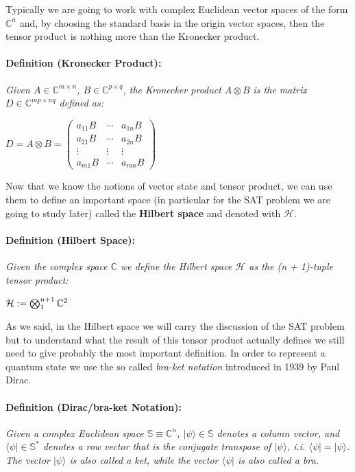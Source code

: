 \documentclass[english]{article}
\newcommand{\sbigotimes}{%
	\mathop{\mathchoice{\textstyle\bigotimes}{\bigotimes}{\bigotimes}{\bigotimes}}%
}
\begin{document}
			Typically we are going to work with complex Euclidean vector spaces of the form $\mathbb{C}^n$ and, by choosing the standard basis in the origin vector spaces, then the tensor product is nothing more than the Kronecker product.
			
			\paragraph{Definition (Kronecker Product):} \emph{Given $A \in \mathbb{C}^{m\times n}$, $B \in \mathbb{C}^{p\times q}$, the Kronecker product $A \otimes B$ is the matrix $D \in \mathbb{C}^{mp\times nq}$ defined as:}
			\begin{center}
				$
				D = A\otimes B =
				\begin{pmatrix}
				a_{11}B & \cdots & a_{1n}B \\
				a_{21}B & \cdots  & a_{2n}B \\
				\vdots & \vdots & \vdots \\
				a_{m1}B & \cdots & a_{mn}B
				\end{pmatrix}
				$
			\end{center}
		
			Now that we know the notions of vector state and tensor product, we can use them to define an important space (in particular for the SAT problem we are going to study later) called the \textbf{Hilbert space} and denoted with $\mathcal{H}$.
			
			\paragraph{Definition (Hilbert Space):} \emph{Given the complex space $\mathbb{C}$ we define the Hilbert space $\mathcal{H}$ as the (n + 1)-tuple tensor product:}
			\begin{center}
				$
				\mathcal{H} := \sbigotimes_1^{n+1} \mathbb{C}^{2}
				$
			\end{center}
		
			As we said, in the Hilbert space we will carry the discussion of the SAT problem but to understand what the result of this tensor product actually defines we still need to give probably the most important definition. In order to represent a quantum state we use the so called \emph{bra-ket notation} introduced in 1939 by Paul Dirac.
			
			\paragraph{Definition (Dirac/bra-ket Notation):} \emph{Given a complex Euclidean space $\mathbb{S} \equiv \mathbb{C}^{n}$, $|\psi\rangle \in \mathbb{S}$ denotes a column vector, and $\langle\psi| \in \mathbb{S}^{*}$ denotes a row vector that is the conjugate transpose of $|\psi\rangle$, i.i. $\langle\psi| = |\psi\rangle$. The vector $|\psi\rangle$ is also called a ket, while the vector $\langle\psi|$ is also called a bra.} \\
			
\end{document}
